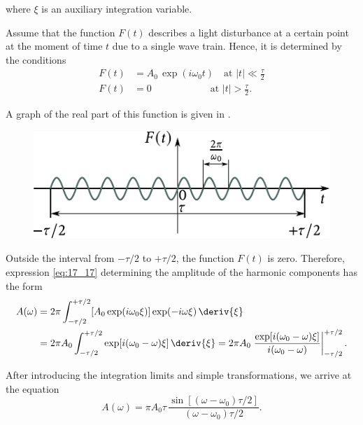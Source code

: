 \noindent
where $\xi$ is an auxiliary integration variable.

Assume that the function $F(t)$ describes a light disturbance at a certain point at the moment of time $t$ due to a single wave train.
Hence, it is determined by the conditions
\begin{align*}
    F(t) &= A_0\, \exp(i \omega_0 t) \quad \text{at } |t| \ll \frac{\tau}{2} \\
    F(t) &= 0 \quad\quad\quad\quad\quad\quad\! \text{at } |t| > \frac{\tau}{2}.
\end{align*}

\noindent
A graph of the real part of this function is given in .

\begin{figure}[!htb]
	\begin{center}
		\includegraphics[scale=1]{figures/ch_17/fig_17_4.pdf}
		\caption[]{}
		\label{fig:17_4}
	\end{center}
	\vspace{-0.9cm}
\end{figure}

Outside the interval from $-\tau/2$ to $+\tau/2$, the function $F(t)$ is zero.
Therefore, expression \eqref{eq:17_17} determining the amplitude of the harmonic components has the form
\begin{align*}
    A(\omega) &= 2\pi \int_{-\tau/2}^{+\tau/2} [A_0 \exp(i\omega_0\xi)] \exp(-i\omega\xi)\, \deriv{\xi}\\
    &= 2\pi A_0 \int_{-\tau/2}^{+\tau/2} \exp[i(\omega_0-\omega)\xi]\, \deriv{\xi} = 2\pi A_0 \left.\frac{\exp[i(\omega_0-\omega)\xi]}{i(\omega_0-\omega)}\right|^{+\tau/2}_{-\tau/2}.
\end{align*}

\noindent
After introducing the integration limits and simple transformations, we arrive at the equation
\begin{equation*}
    A(\omega) = \pi A_0 \tau\, \frac{\sin[(\omega-\omega_0)\tau/2]}{(\omega-\omega_0)\tau/2}.
\end{equation*}

